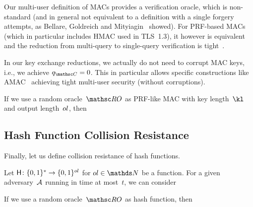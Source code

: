 Our multi-user definition of MACs provides a verification oracle, which is non-standard (and in general not equivalent to a definition with a single forgery attempts, as Bellare, Goldreich and Mityiagin~\cite{EPRINT:BelGolMit04} showed).
For PRF-based MACs (which in particular includes HMAC used in TLS~1.3), it however is equivalent and the reduction from multi-query to single-query verification is tight~\cite{EPRINT:BelGolMit04}.

In our key exchange reductions, we actually do not need to corrupt MAC keys, i.e., we achieve $\qCorrupt = 0$.
This in particular allows specific constructions like AMAC~\cite{EC:BelBerTes16} achieving tight multi-user security (without corruptions).

If we use a random oracle~$\RO$ as PRF-like MAC with key length~$\kl$ and output length~$ol$, then

\iffull 
\subsection{Hash Function Collision Resistance}
\label{sec:components:Hash}

Finally, let us define collision resistance of hash functions.
\else
\label{apx:components:Hash}
\fi


\begin{definition}
	\label{def:hash-function}
	Let $\mathsf{H} \colon \{0,1\}^* \to \{0,1\}^{ol}$ for $\ol \in \NN$ be a function.
	For a given adversary~$\mathcal{A}$ running in time at most~$t$, we can consider
\end{definition}
\noindent
If we use a random oracle~$\RO$ as hash function, then
